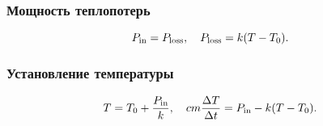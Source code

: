 \documentclass[12pt, a4paper]{article}
\begin{document}
\subsubsection*{Мощность теплопотерь}
\[
P_{\rm in} = P_{\rm loss}, \quad
P_{\rm loss} = k (T - T_0).
\]

\subsubsection*{Установление температуры}
\[
T = T_0 + \frac{P_{\rm in}}{k},
\quad
cm \frac{\Delta T}{\Delta t} = P_{\rm in} - k (T - T_0).
\]
\end{document}
